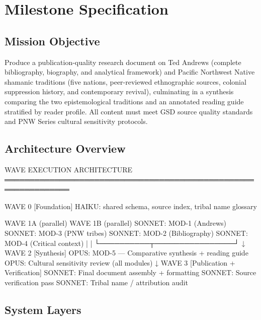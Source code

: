 \documentclass[11pt,letterpaper]{article}
\newcommand{\stageheader}[2]{%
  \noindent\colorbox{#2}{\makebox[\textwidth][l]{%
    \textcolor{white}{\bfseries\sffamily\hspace{6pt}#1\hspace{6pt}}}}%
  \vspace{0.5em}\par%
}
\begin{document}
\newpage

\stageheader{STAGE 3 --- MISSION PACKAGE}{tertiary}

\section{Milestone Specification}

\subsection{Mission Objective}

Produce a publication-quality research document on Ted Andrews (complete bibliography, biography, and analytical framework) and Pacific Northwest Native shamanic traditions (five nations, peer-reviewed ethnographic sources, colonial suppression history, and contemporary revival), culminating in a synthesis comparing the two epistemological traditions and an annotated reading guide stratified by reader profile. All content must meet GSD source quality standards and PNW Series cultural sensitivity protocols.

\subsection{Architecture Overview}

\begin{asciibox}
WAVE EXECUTION ARCHITECTURE
═══════════════════════════════════════════════════════════════

WAVE 0 [Foundation]
  HAIKU: shared schema, source index, tribal name glossary

WAVE 1A (parallel)          WAVE 1B (parallel)
  SONNET: MOD-1 (Andrews)     SONNET: MOD-3 (PNW tribes)
  SONNET: MOD-2 (Bibliography) SONNET: MOD-4 (Critical context)
         |                           |
         └──────────┬────────────────┘
                    ↓
WAVE 2 [Synthesis]
  OPUS: MOD-5 — Comparative synthesis + reading guide
  OPUS: Cultural sensitivity review (all modules)
                    ↓
WAVE 3 [Publication + Verification]
  SONNET: Final document assembly + formatting
  SONNET: Source verification pass
  SONNET: Tribal name / attribution audit
\end{asciibox}

\subsection{System Layers}
\end{document}
